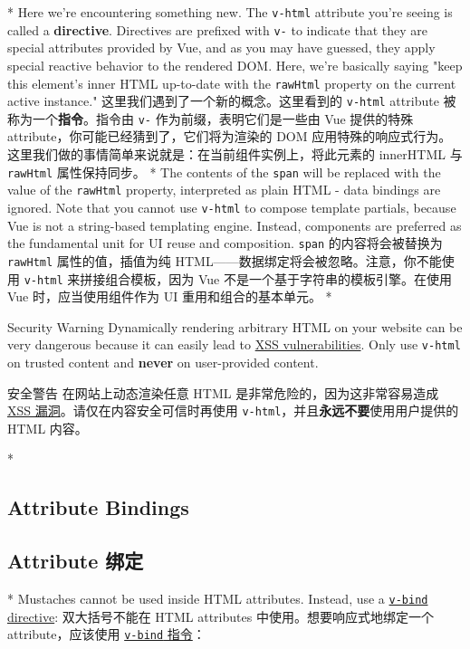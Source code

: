 \begin{paracol}{2}
\switchcolumn[0]*%
Here we're encountering something new. The \texttt{v-html} attribute
you're seeing is called a \textbf{directive}. Directives are prefixed
with \texttt{v-} to indicate that they are special attributes provided
by Vue, and as you may have guessed, they apply special reactive
behavior to the rendered DOM. Here, we're basically saying "keep this
element's inner HTML up-to-date with the \texttt{rawHtml} property on
the current active instance."
\switchcolumn
这里我们遇到了一个新的概念。这里看到的 \texttt{v-html} attribute
被称为一个\textbf{指令}。指令由 \texttt{v-} 作为前缀，表明它们是一些由
Vue 提供的特殊 attribute，你可能已经猜到了，它们将为渲染的 DOM
应用特殊的响应式行为。这里我们做的事情简单来说就是：在当前组件实例上，将此元素的
innerHTML 与 \texttt{rawHtml} 属性保持同步。
\switchcolumn[0]*%
The contents of the \texttt{span} will be replaced with the value of the
\texttt{rawHtml} property, interpreted as plain HTML - data bindings are
ignored. Note that you cannot use \texttt{v-html} to compose template
partials, because Vue is not a string-based templating engine. Instead,
components are preferred as the fundamental unit for UI reuse and
composition.
\switchcolumn
\texttt{span} 的内容将会被替换为 \texttt{rawHtml} 属性的值，插值为纯
HTML------数据绑定将会被忽略。注意，你不能使用 \texttt{v-html}
来拼接组合模板，因为 Vue 不是一个基于字符串的模板引擎。在使用 Vue
时，应当使用组件作为 UI 重用和组合的基本单元。
\switchcolumn[0]*%
\begin{vueQuoteWarn}{Security Warning}
Dynamically rendering arbitrary HTML on your website can be very
dangerous because it can easily lead to
\href{https://en.wikipedia.org/wiki/Cross-site_scripting}{XSS
vulnerabilities}. Only use \texttt{v-html} on trusted content and
\textbf{never} on user-provided content.
\end{vueQuoteWarn}
\switchcolumn
\begin{vueQuoteWarn}{安全警告}
在网站上动态渲染任意 HTML 是非常危险的，因为这非常容易造成
\href{https://zh.wikipedia.org/wiki/跨網站指令碼}{XSS
漏洞}。请仅在内容安全可信时再使用
\texttt{v-html}，并且\textbf{永远不要}使用用户提供的 HTML 内容。
\end{vueQuoteWarn}
\switchcolumn[0]*%
\subsection{Attribute Bindings}
\switchcolumn
\subsection{Attribute 绑定}
\switchcolumn[0]*%
Mustaches cannot be used inside HTML attributes. Instead, use a
\href{https://vuejs.org/api/built-in-directives.html\#v-bind}{\texttt{v-bind}
directive}:
\switchcolumn
双大括号不能在 HTML attributes 中使用。想要响应式地绑定一个
attribute，应该使用
\href{https://cn.vuejs.org/api/built-in-directives.html\#v-bind}{\texttt{v-bind}
指令}：


\end{paracol}
